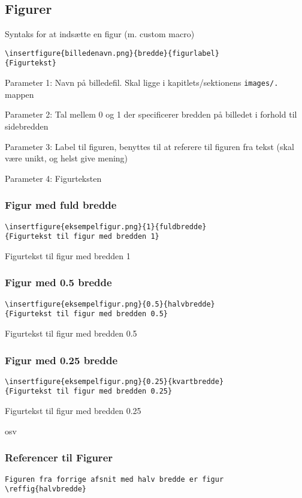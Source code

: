 \subsection{Figurer}
\label{sec:figurer}
Syntaks for at indsætte en figur (m. custom macro)
\begin{verbatim}
\insertfigure{billedenavn.png}{bredde}{figurlabel}
{Figurtekst}
\end{verbatim}

Parameter 1: Navn på billedefil. Skal ligge i kapitlets/sektionens \texttt{images/.} mappen

Parameter 2: Tal mellem 0 og 1 der specificerer bredden på billedet i forhold til sidebredden

Parameter 3: Label til figuren, benyttes til at referere til figuren fra tekst (skal være unikt, og helst give mening)

Parameter 4: Figurteksten 

\subsubsection{Figur med fuld bredde}
\begin{verbatim}
\insertfigure{eksempelfigur.png}{1}{fuldbredde}
{Figurtekst til figur med bredden 1}
\end{verbatim}

{Figurtekst til figur med bredden 1}

\subsubsection{Figur med 0.5 bredde}
\begin{verbatim}
\insertfigure{eksempelfigur.png}{0.5}{halvbredde}
{Figurtekst til figur med bredden 0.5}
\end{verbatim}

{Figurtekst til figur med bredden 0.5}

\subsubsection{Figur med 0.25 bredde}
\begin{verbatim}
\insertfigure{eksempelfigur.png}{0.25}{kvartbredde}
{Figurtekst til figur med bredden 0.25}
\end{verbatim}

{Figurtekst til figur med bredden 0.25}

osv



\subsubsection{Referencer til Figurer}

\begin{verbatim}
Figuren fra forrige afsnit med halv bredde er figur \reffig{halvbredde}
\end{verbatim}
